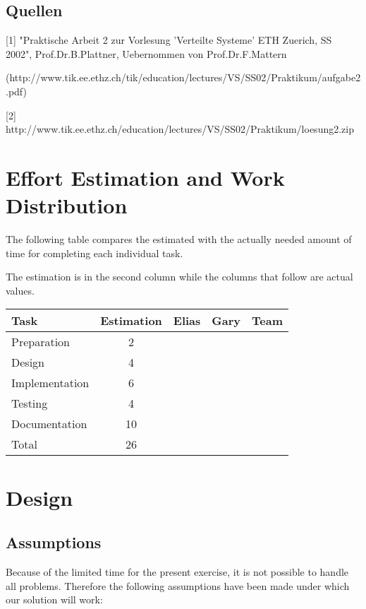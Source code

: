 \documentclass[11pt, a4paper]{article}
\begin{document}
\subsection{Quellen}

[1] "Praktische Arbeit 2 zur Vorlesung 'Verteilte Systeme' ETH
Zuerich, SS 2002", Prof.Dr.B.Plattner, Uebernommen von
Prof.Dr.F.Mattern

(http://www.tik.ee.ethz.ch/tik/education/lectures/VS/SS02/Praktikum/aufgabe2.pdf)

[2] http://www.tik.ee.ethz.ch/education/lectures/VS/SS02/Praktikum/loesung2.zip

\newpage

\section{Effort Estimation and Work Distribution}

The following table compares the estimated with the actually needed
amount of time for completing each individual task.

The estimation is in the second column while the columns that follow
are actual values.

\parskip 12pt
\begin{tabular} {| l | c | c | c | c |}
	\hline
	Task					&	Estimation		& 	Elias 	& 	Gary 	& 	Team	\\ \hline \hline
	Preparation				&	2				&			&  			&			\\ \hline
	Design					&	4				&			&			&			\\ \hline
	Implementation			&	6				&			&			& 	 		\\ \hline
	Testing					&	4				&			& 	 		& 	 		\\ \hline
	Documentation			&	10				&			&	 		& 			\\ \hline 
	Total					&	26				&			&			& 			\\
	\hline
\end{tabular}

\section{Design}

\subsection{Assumptions}

Because of the limited time for the present exercise, it is not
possible to handle all problems. Therefore the following assumptions
have been made under which our solution will work:
\end{document}
